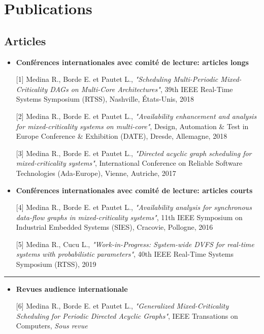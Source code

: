\documentclass{article}
\begin{document}

\section{Publications}

\subsection{Articles}

\begin{itemize}
	\item \textbf{Conférences internationales avec comité de lecture: articles longs}
	
	[1] Medina R., Borde E. et Pautet L.,  \textit{"Scheduling Multi-Periodic Mixed-Criticality DAGs on 
	Multi-Core Architectures"}, 39th IEEE Real-Time Systems Symposium (RTSS), Nashville, États-Unis, 2018

	[2] Medina R., Borde E. et Pautet L.,  \textit{"Availability enhancement and analysis for mixed-criticality 
	systems on multi-core"}, Design, Automation \& Test in Europe Conference \& Exhibition (DATE), Dresde, 
	Allemagne, 2018
	
	[3] Medina R., Borde E. et Pautet L.,  \textit{"Directed acyclic graph scheduling for mixed-criticality 
	systems"}, International Conference on Reliable Software Technologies (Ada-Europe), Vienne, Autriche, 
	2017
	
	\item \textbf{Conférences internationales avec comité de lecture: articles courts}
	
	[4] Medina R., Borde E. et Pautet L.,  \textit{"Availability analysis for synchronous data-flow graphs in 
	mixed-criticality systems"}, 11th IEEE Symposium on Industrial Embedded Systems (SIES), Cracovie, 
	Pollogne, 	2016
	
	[5] Medina R., Cucu L.,  \textit{"Work-in-Progress: System-wide DVFS for real-time
systems with 
	probabilistic parameters"}, 40th IEEE Real-Time Systems Symposium (RTSS), 2019
	
\end{itemize}

\rule{\textwidth}{0.4pt}

\begin{itemize}
	\item \textbf{Revues audience internationale}
	
	[6] Medina R., Borde E. et Pautet L.,  \textit{"Generalized Mixed-Criticality Scheduling for Periodic 
	Directed Acyclic Graphs"}, IEEE Transations on Computers, \textit{Sous revue}
	
\end{itemize}
\end{document}
